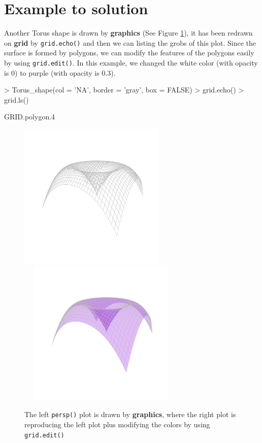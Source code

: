 \documentclass[11pt,twoside]{report}
\begin{document}
\section{Example to solution}
Another Torus shape is drawn by \textbf{graphics} (See Figure \ref{Example_6.3}), it has been redrawn on \textbf{grid} by \texttt{grid.echo()} and then we can listing the grobs of this plot. Since the surface is formed by polygons, we can modify the features of the polygons easily by using \texttt{grid.edit()}. In this example, we changed the white color (with opacity is 0) to purple (with opacity is 0.3).\\
\begin{Schunk}
\begin{Sinput}
> Torus_shape(col = 'NA', border = 'gray', box = FALSE)
> grid.echo()
> grid.ls()
\end{Sinput}
\begin{Soutput}
GRID.polygon.4
\end{Soutput}
\end{Schunk}

\begin{figure}[h]
	\begin{center}
		\includegraphics[height = 7cm, width = 7cm]{figure/Chapter6_example_1_2.pdf}
		\includegraphics[height = 7cm, width = 8cm]{figure/Chapter6_example_1_3.pdf}
		\caption{The left \texttt{persp()} plot is drawn by \textbf{graphics}, where the right plot is reproducing the left plot plus modifying the colors by using \texttt{grid.edit()}}
		\label{Example_6.3}
	\end{center}
\end{figure}
\end{document}
